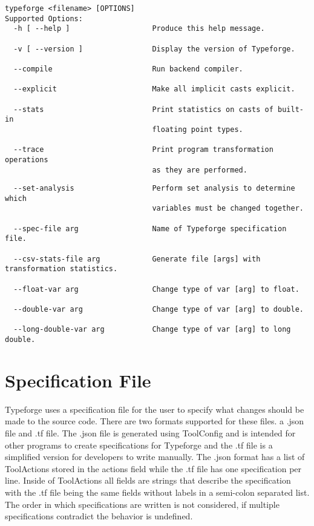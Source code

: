 \documentclass[natbib]{article}
\begin{document}
\begin{verbatim}
typeforge <filename> [OPTIONS]
Supported Options:
  -h [ --help ]                   Produce this help message.
  
  -v [ --version ]                Display the version of Typeforge.
  
  --compile                       Run backend compiler.
  
  --explicit                      Make all implicit casts explicit.
  
  --stats                         Print statistics on casts of built-in 
                                  floating point types.
                                  
  --trace                         Print program transformation operations 
                                  as they are performed.
\end{verbatim}
\begin{verbatim}
  --set-analysis                  Perform set analysis to determine which 
                                  variables must be changed together.
                                  
  --spec-file arg                 Name of Typeforge specification file.
  
  --csv-stats-file arg            Generate file [args] with transformation statistics.
  
  --float-var arg                 Change type of var [arg] to float.
  
  --double-var arg                Change type of var [arg] to double.
  
  --long-double-var arg           Change type of var [arg] to long double.
\end{verbatim}
\section{Specification File}
Typeforge uses a specification file for the user to specify what changes should be 
made to the source code. There are two formats supported for these files. a .json 
file and .tf file. The .json file is generated using ToolConfig and is intended 
for other programs to create specifications for Typeforge and the .tf file is a 
simplified version for developers to write manually. The .json format has a list 
of ToolActions stored in the actions field while the .tf file has one specification 
per line. Inside of ToolActions all fields are strings that describe the specification 
with the .tf file being the same fields without labels in a semi-colon separated list. 
The order in which specifications are written is not considered, if multiple 
specifications contradict the behavior is undefined. 
\end{document}
